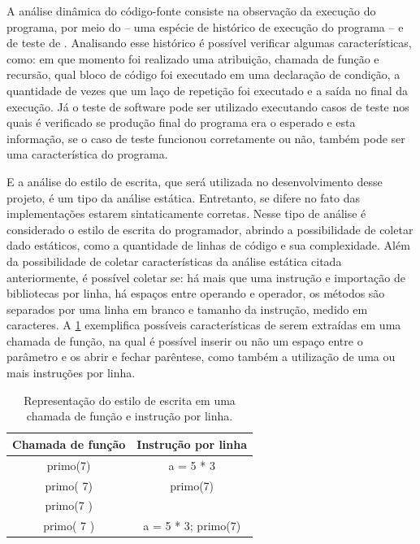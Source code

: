 			A análise dinâmica do código-fonte consiste na observação da execução do
			programa, por meio do  -- uma espécie de histórico de execução
			do programa -- e de teste de . Analisando esse histórico é
			possível verificar algumas características, como: em que momento foi realizado
			uma atribuição, chamada de função e recursão, qual bloco de código foi
			executado em uma declaração de condição, a quantidade de vezes que um laço
			de repetição foi executado e a saída no final da execução. Já o teste de
			software pode ser utilizado executando casos de teste nos quais é verificado
			se produção final do programa era o esperado e esta informação, se o caso de
			teste funcionou corretamente ou não, também pode ser uma característica do programa.
			
			E a análise do estilo de escrita, que será utilizada no desenvolvimento desse projeto,
			é um tipo da análise estática. Entretanto, se difere no fato das implementações estarem
			sintaticamente corretas. Nesse tipo de análise é considerado o estilo de escrita do
			programador, abrindo a possibilidade de coletar dado estáticos, como a quantidade de
			linhas de código e sua complexidade. Além da possibilidade de coletar
			características da análise estática citada anteriormente, é possível coletar se:
			há mais que uma instrução e importação de bibliotecas por linha, há espaços entre
			operando e operador, os métodos são separados por uma linha em branco e tamanho
			da instrução, medido em caracteres. A \cref{tab:exemploEstEsc} exemplifica
			possíveis características de serem extraídas em uma chamada de função, na qual é
			possível inserir ou não um espaço entre o parâmetro e os  abrir
			e fechar parêntese, como também a utilização de uma ou mais instruções por linha.
			
			\begin{table}
				\centering
				\begin{tabular}{|c|c|}
					\hline
					Chamada de função & Instrução por linha \\ \hline
					primo(7)          & a = 5 * 3  \\
					primo( 7)         & primo(7)     \\
					primo(7 )         &      \\
					primo( 7 )        & a = 5 * 3; primo(7)    \\
					\hline
				\end{tabular}
				\captionsetup{justification=centering}
				\caption[Representação do estilo de escrita]{Representação do estilo
				de escrita em uma chamada de função e instrução por linha.}
				\label{tab:exemploEstEsc}
			\end{table}
			
